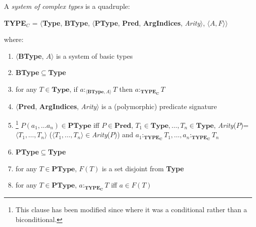 A {\it system of complex types\/} is a quadruple:
\begin{display}
{\bf TYPE$_C$} = $\langle${\bf Type}, {\bf BType},
$\langle$\textbf{PType}, {\bf Pred}, \textbf{ArgIndices}, {\it Arity\/}$\rangle$, $\langle A,F\rangle$$\rangle$
\end{display}
where:  
\begin{enumerate} 
 
\item $\langle$\textbf{BType}, $A$$\rangle$ is a system of basic types 
 
\item \textbf{BType}$\subseteq$\textbf{Type}

\item for any $T\in\textbf{Type}$, if $a:_{\langle\mathbf{BType},
    A\rangle}T$ then $a:_{\mathbf{TYPE_C}}T$

\item \label{cl:predtypes}$\langle${\bf Pred}, \textbf{ArgIndices},
  {\it Arity\/}$\rangle$ is a (polymorphic) predicate
  signature

\item\hspace*{-1ex}\footnote{This clause has been modified since
    \cite{Cooper2012} where it was a conditional rather than a biconditional.} %
  $P(a_1,\ldots a_n)\in\textbf{PType}$ iff $P\in\textbf{Pred}$, $T_1\in \mathbf{Type},\ldots,T_n\in
  \mathbf{Type}$, \textit{Arity}($P$)=$\langle
  T_1,\ldots,T_n\rangle$  ($\langle
  T_1,\ldots,T_n\rangle$$\in$\textit{Arity}($P$)) and $a_1:_{\mathbf{TYPE_C}}T_1,\ldots,a_n:_{\mathbf{TYPE_C}}T_n$




\item \textbf{PType}$\subseteq$\textbf{Type}

\item for any $T\in\textbf{PType}$, $F(T)$ is a set disjoint from \textbf{Type}

\item for any $T\in\textbf{PType}$, $a:_{\mathbf{TYPE_C}}T$ iff $a\in F(T)$
 
\end{enumerate}

